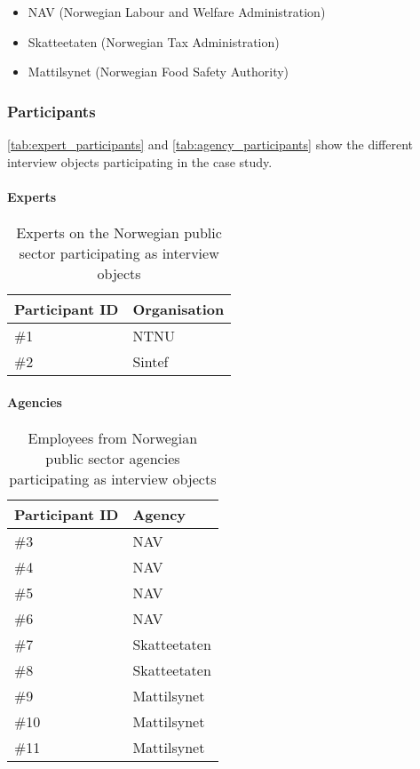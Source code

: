 \begin{itemize}
    \item NAV (Norwegian Labour and Welfare Administration)
    \item Skatteetaten (Norwegian Tax Administration)
    \item Mattilsynet (Norwegian Food Safety Authority)
\end{itemize}

\subsubsection{Participants}
\autoref{tab:expert_participants} and \autoref{tab:agency_participants} show the different interview objects participating in the case study.

\paragraph{Experts} \hspace{0cm}
\begin{table}[H]
\centering
\begin{tabular}{|l|l|}
\hline
\textbf{Participant ID} & \textbf{Organisation} \\ \hline
\#1 & NTNU  \\ \hline
\#2 & Sintef \\ \hline
\end{tabular}
\caption{Experts on the Norwegian public sector participating as interview objects}
\label{tab:expert_participants}
\end{table}

\paragraph{Agencies} \hspace{0cm}
\begin{table}[H]
\centering
\begin{tabular}{|l|l|}
\hline
\textbf{Participant ID} & \textbf{Agency} \\ \hline
\#3 & NAV  \\ \hline
\#4 & NAV  \\ \hline
\#5 & NAV  \\ \hline
\#6 & NAV  \\ \hline
\#7 & Skatteetaten  \\ \hline
\#8 & Skatteetaten  \\ \hline
\#9 & Mattilsynet  \\ \hline
\#10 & Mattilsynet  \\ \hline
\#11 & Mattilsynet  \\ \hline
\end{tabular}
\caption{Employees from Norwegian public sector agencies participating as interview objects}
\label{tab:agency_participants}
\end{table}

